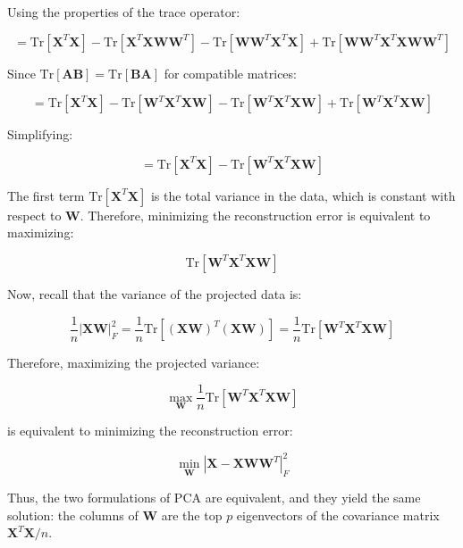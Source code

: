 Using the properties of the trace operator:

$$= \text{Tr}[\mathbf{X}^T\mathbf{X}] - \text{Tr}[\mathbf{X}^T\mathbf{X}\mathbf{W}\mathbf{W}^T] - \text{Tr}[\mathbf{W}\mathbf{W}^T\mathbf{X}^T\mathbf{X}] + \text{Tr}[\mathbf{W}\mathbf{W}^T\mathbf{X}^T\mathbf{X}\mathbf{W}\mathbf{W}^T]$$

Since $\text{Tr}[\mathbf{A}\mathbf{B}] = \text{Tr}[\mathbf{B}\mathbf{A}]$ for compatible matrices:

$$= \text{Tr}[\mathbf{X}^T\mathbf{X}] - \text{Tr}[\mathbf{W}^T\mathbf{X}^T\mathbf{X}\mathbf{W}] - \text{Tr}[\mathbf{W}^T\mathbf{X}^T\mathbf{X}\mathbf{W}] + \text{Tr}[\mathbf{W}^T\mathbf{X}^T\mathbf{X}\mathbf{W}]$$

Simplifying:

$$= \text{Tr}[\mathbf{X}^T\mathbf{X}] - \text{Tr}[\mathbf{W}^T\mathbf{X}^T\mathbf{X}\mathbf{W}]$$

The first term $\text{Tr}[\mathbf{X}^T\mathbf{X}]$ is the total variance in the data, which is constant with respect to $\mathbf{W}$. Therefore, minimizing the reconstruction error is equivalent to maximizing:

$$\text{Tr}[\mathbf{W}^T\mathbf{X}^T\mathbf{X}\mathbf{W}]$$

Now, recall that the variance of the projected data is:

$$\frac{1}{n}|\mathbf{X}\mathbf{W}|_F^2 = \frac{1}{n}\text{Tr}[(\mathbf{X}\mathbf{W})^T(\mathbf{X}\mathbf{W})] = \frac{1}{n}\text{Tr}[\mathbf{W}^T\mathbf{X}^T\mathbf{X}\mathbf{W}]$$

Therefore, maximizing the projected variance:

$$\max_{\mathbf{W}} \frac{1}{n}\text{Tr}[\mathbf{W}^T\mathbf{X}^T\mathbf{X}\mathbf{W}]$$

is equivalent to minimizing the reconstruction error:

$$\min_{\mathbf{W}} |\mathbf{X} - \mathbf{X}\mathbf{W}\mathbf{W}^T|_F^2$$

Thus, the two formulations of PCA are equivalent, and they yield the same solution: the columns of $\mathbf{W}$ are the top $p$ eigenvectors of the covariance matrix $\mathbf{X}^T\mathbf{X}/n$.













\newpage